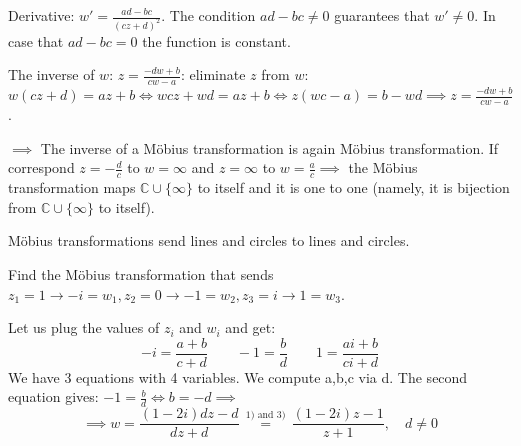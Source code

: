 Derivative: $w' = \frac{ad-bc}{(cz+d)^2}$. The condition $ad-bc \neq 0$ guarantees that $w' \neq 0$. In case that $ad-bc = 0$ the function is constant.

The inverse of $w$: $z = \frac{-dw+b}{cw-a}$: eliminate $z$ from $w$: $w(cz+d) = az+b \iff wcz + wd = az + b \iff z(wc-a) = b - wd \implies z = \frac{-dw+b}{cw-a}$.

$\implies$ The inverse of a Möbius transformation is again Möbius transformation. If correspond $z = -\frac{d}{c}$ to $w = \infty$ and $z = \infty$ to $w = \frac{a}{c} \implies$ the Möbius transformation maps $\mathbb{C} \cup \{\infty\}$ to itself and it is one to one (namely, it is bijection from $\mathbb{C} \cup \{\infty\}$ to itself).

\begin{proposition} \label{proposition:14.1} Möbius transformations send lines and circles to lines and circles.
\end{proposition}
\begin{example}\label{example:16.3}
     Find the Möbius transformation that sends $z_1 = 1 \to -i = w_1, z_2 = 0 \to -1 = w_2, z_3 = i \to 1 = w_3$.
\begin{soln}
    Let us plug the values of $z_i$ and $w_i$ and get:
    \[  -i = \frac{a+b}{c+d} \qquad -1 = \frac{b}{d} \qquad 1 = \frac{ai+b}{ci+d} \]
    We have 3 equations with 4 variables. We compute a,b,c via d. The second equation gives: $-1 = \frac{b}{d} \iff b = -d \implies$
    \[ \implies w = \frac{(1-2i)dz - d}{dz + d} \, \overset{1) \text{ and } 3)}{=} \, \frac{(1-2i)z - 1}{z + 1}, \quad d \neq 0 \]
\end{soln}
\end{example}

